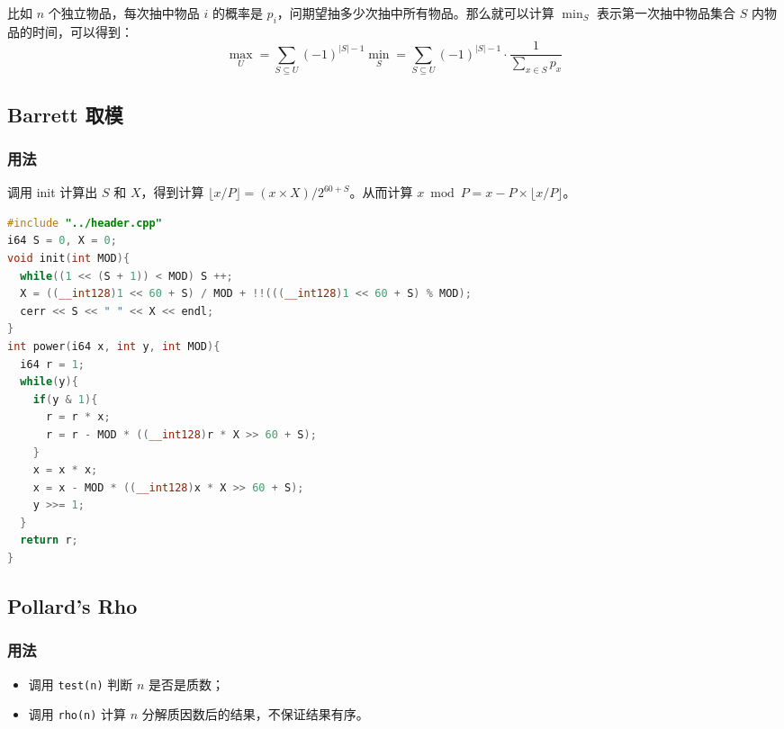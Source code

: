 \documentclass[10pt]{ctexart}
\providecommand{\tightlist}{\setlength{\itemsep}{0pt}\setlength{\parskip}{0pt}}
\newcommand{\passthrough}[1]{#1}
\begin{document}
\begin{multicols}{3}
    比如 \(n\) 个独立物品，每次抽中物品 \(i\) 的概率是
    \(p_i\)，问期望抽多少次抽中所有物品。那么就可以计算 \(\min_S\)
    表示第一次抽中物品集合 \(S\)
    内物品的时间，可以得到：\[\max_{U}=\sum_{S\subseteq U}(-1)^{|S| - 1}\min_S = \sum_{S\subseteq U}(-1)^{|S| - 1}\cdot \frac{1}{\sum _{x\in S}p_x}\]

    \subsection{Barrett 取模}\label{barrett-ux53d6ux6a21}

    \subsubsection{用法}\label{ux7528ux6cd5-12}

    调用 init 计算出 \(S\) 和 \(X\)，得到计算
    \(\lfloor x / P \rfloor = (x\times X) / 2^{60 + S}\)。从而计算
    \(x \bmod P = x - P \times \lfloor x / P \rfloor\)。

\begin{lstlisting}[language={C++}]
#include "../header.cpp"
i64 S = 0, X = 0;
void init(int MOD){
  while((1 << (S + 1)) < MOD) S ++;
  X = ((__int128)1 << 60 + S) / MOD + !!(((__int128)1 << 60 + S) % MOD);
  cerr << S << " " << X << endl;
}
int power(i64 x, int y, int MOD){
  i64 r = 1;
  while(y){
    if(y & 1){
      r = r * x;
      r = r - MOD * ((__int128)r * X >> 60 + S);
    }
    x = x * x;
    x = x - MOD * ((__int128)x * X >> 60 + S);
    y >>= 1;
  }
  return r;
}
\end{lstlisting}

    \subsection{Pollard's Rho}\label{pollards-rho}

    \subsubsection{用法}\label{ux7528ux6cd5-13}

    \begin{itemize}
    \tightlist
    \item
      调用 \passthrough{\lstinline!test(n)!} 判断 \(n\) 是否是质数；
    \item
      调用 \passthrough{\lstinline!rho(n)!} 计算 \(n\)
      分解质因数后的结果，不保证结果有序。
    \end{itemize}


\end{multicols}
\end{document}
